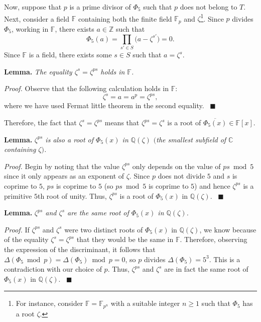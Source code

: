 \documentclass[a4paper, 12pt]{article}
\theoremstyle{definition}
\newcommand{\Z}{\mathbb{Z}}
\newcommand{\Q}{\mathbb{Q}}
\newcommand{\C}{\mathbb{C}}
\newcommand{\F}{\mathbb{F}}
\begin{document}
Now, suppose that $p$ is a prime divisor of $\Phi_{5}$ such that $p$ does not belong to $T$. Next, consider a field $\F$ containing both the finite field $\F_p$ and $\zeta$\footnote{For instance, consider $\F=\F_{p^n}$ with a suitable integer $n\geqslant 1$ such that $\Phi_{5}$ has a root $\zeta$.}. Since $p$ divides $\Phi_{5}$, working in $\F$, there exists $a\in\Z$ such that 
\begin{equation*}
\Phi_{5}(a)=\prod_{s'\in S}\big(a-\zeta^{s'}\big)=0.
\end{equation*}
Since $\F$ is a field, there exists some $s\in S$ such that $a=\zeta^{s}$.

\textbf{Lemma.} \emph{The equality $\zeta^s=\zeta^{ps}$ holds in $\F$.}

\textit{Proof.} Observe that the following calculation holds in $\F$:
\begin{equation*}\label{eq:reproots}
\zeta^{s}=a=a^p=\zeta^{ps},
\end{equation*}
where we have used Fermat little theorem in the second equality. \ $\blacksquare$ 

Therefore, the fact that $\zeta^{s}=\zeta^{ps}$ means that $\zeta^{ps}=\zeta^{s}$ is a root of $\overline{\Phi_{5}(x)}\in\F[x]$. 

\textbf{Lemma.} \emph{$\zeta^{ps}$ is also a root of $\Phi_{5}(x)$ in $\Q(\zeta)$ $($the smallest subfield of $\C$ containing $\zeta)$.}

\textit{Proof.} Begin by noting that the value $\zeta^{ps}$ only depends on the value of $ps \bmod{5}$ since it only appears as an exponent of $\zeta$. Since $p$ does not divide $5$ and $s$ is coprime to $5$, $ps$ is coprime to $5$ (so $ps \bmod{5}$ is coprime to $5$) and hence $\zeta^{ps}$ is a primitive $5$th root of unity. Thus, $\zeta^{ps}$ is a root of $\Phi_{5}(x)$ in $\Q(\zeta)$. \ $\blacksquare$

\textbf{Lemma.} \emph{$\zeta^{ps}$ and $\zeta^{s}$ are the same root of $\Phi_{5}(x)$ in $\Q(\zeta)$.}

\textit{Proof.} If $\zeta^{ps}$ and $\zeta^{s}$ were two distinct roots of $\Phi_{5}(x)$ in $\Q(\zeta)$, we know because of the equality $\zeta^{s}=\zeta^{ps}$ that they would be the same in $\F$. Therefore, observing the expression of the discriminant, it follows that $\Delta(\Phi_{5} \bmod{p})=\Delta(\Phi_{5}) \bmod{p}=0$, so $p$ divides $\Delta(\Phi_{5})=5^{3}$. This is a contradiction with our choice of $p$. Thus, $\zeta^{ps}$ and $\zeta^{s}$ are in fact the same root of $\Phi_{5}(x)$ in $\Q(\zeta)$. \ $\blacksquare$
\end{document}
